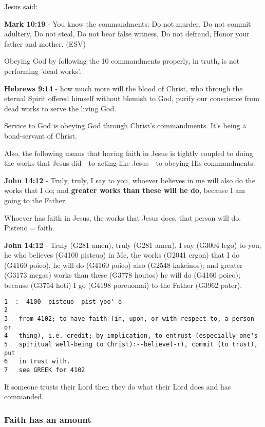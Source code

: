 \documentclass[11pt]{article}
\begin{document}
Jesus said:

\textbf{Mark 10:19} - You know the commandments: Do not murder, Do not commit adultery, Do not steal, Do not bear false witness, Do not defraud, Honor your father and mother. (ESV)

Obeying God by following the 10 commandments properly, in truth, is not performing 'dead works'.

\textbf{Hebrews 9:14} - how much more will the blood of Christ, who through the eternal Spirit offered himself without blemish to God, purify our conscience from dead works to serve the living God.

Service to God is obeying God through Christ's commandments. It's being a bond-servant of Christ.

Also, the following means that having faith in Jesus is tightly coupled to doing the works that Jesus did - to acting like Jesus - to obeying His commandments.

\textbf{John 14:12} - Truly, truly, I say to you, whoever believes in me will also do the works that I do; and \textbf{greater works than these will he do}, because I am going to the Father.

Whoever has faith in Jesus, the works that Jesus does, that person will do.
Pisteuo = faith.

\textbf{John 14:12} - Truly (G281 amen), truly (G281 amen), I say (G3004 lego) to you, he who believes (G4100 pisteuo) in Me, the works (G2041 ergon) that I do (G4160 poieo), he will do (G4160 poieo) also (G2548 kakeinos); and greater (G3173 megas) works than these (G3778 houtos) he will do (G4160 poieo); because (G3754 hoti) I go (G4198 poreuomai) to the Father (G3962 pater).

\begin{verbatim}
1  :  4100  pisteuo  pist-yoo'-o
2  
3   from 4102; to have faith (in, upon, or with respect to, a person or
4   thing), i.e. credit; by implication, to entrust (especially one's
5   spiritual well-being to Christ):--believe(-r), commit (to trust), put
6   in trust with.
7   see GREEK for 4102
\end{verbatim}

If someone trusts their Lord then they do what their Lord does and has commanded.

\subsubsection{Faith has an amount}
\label{sec:orgfbbb01f}
\end{document}
